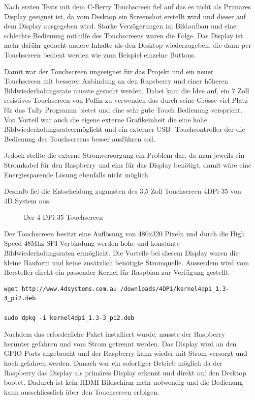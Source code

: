 \documentclass[11pt,a4paper]{article} %
\begin{document}
Nach ersten Tests mit dem C-Berry Touchscreen fiel auf das es nicht als Primäres Display geeignet ist, da vom Desktop ein Screenshot erstellt wird und dieser auf dem Display ausgegeben wird. Starke Verzögerungen im Bildaufbau und eine schlechte Bedienung mithilfe des Touchscreens waren die Folge. Das Display ist mehr daführ gedacht andere Inhalte als den Desktop wiederzugeben, die dann per Touchscreen bedient werden wie zum Beispiel einzelne Buttons.
\par
Damit war der Touchscreen ungeeignet für das Projekt und ein neuer Touchscreen mit besserer Anbindung an den Rapsberry und einer höheren Bildwiederholungsrate musste gesucht werden. Dabei kam die Idee auf, ein 7 Zoll resistives Touchscreen von Pollin zu verwenden das durch seine Grösse viel Platz für das Tally Programm bietet und eine sehr gute Touch Bedienung verspricht. Von Vorteil war auch die eigene externe Grafikeinheit die eine hohe Bildwiederholungsrateermöglicht  und ein externer USB- Touchcontroller der die Bedienung des Touchscreens besser ausführen soll.
\par
Jedoch stellte die externe Stromversorgung ein Problem dar, da man jeweils ein Stromkabel für den Raspberry und eins für das Display benötigt, damit wäre eine Energiesparende Lösung ebenfalls nicht möglich.
\par
Deshalb fiel die Entscheidung zugunsten des 3,5 Zoll Touchscreen 4DPi-35 von 4D System aus.\cite{6} 
\begin{figure}[h]
	\caption{Der 4 DPi-35 Touchscreen}
	\end{figure}
Der Touchscreen besitzt eine Auflösung von 480x320 Pixeln und durch die High Speed 48Mhz SPI Verbindung werden hohe und konstante Bildwiederholungsraten ermöglicht.
\newpage
Die Vorteile bei diesem Display waren die kleine Bauform und keine zusätzlich benötigte Stromquelle. Ausserdem wird vom Hersteller direkt ein passender Kernel für Raspbian zur Verfügung gestellt.
\begin{frame}

\begin{lstlisting}
wget http://www.4dsystems.com.au /downloads/4DPi/kernel4dpi_1.3-3_pi2.deb 

sudo dpkg -i kernel4dpi_1.3-3_pi2.deb
\end{lstlisting}

\end{frame}

 Nachdem das erforderliche Paket installiert wurde, musste der Raspberry herunter gefahren und vom Strom getrennt werden. Das Display wird an den GPIO-Ports angebracht und der Raspberry kann wieder mit Strom versorgt und hoch gefahren werden. Danach war ein sofortiger Betrieb möglich da der Raspberry das Display als primäres Display erkennt und direkt auf den Desktop bootet. Dadurch ist kein HDMI Bildschirm mehr notwendig und die Bedienung kann ausschliesslich über den Touchscreen erfolgen.
\par
\end{document}
